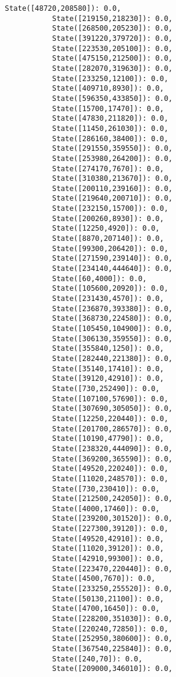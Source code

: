 \documentclass[11pt]{article}
\begin{document}
\begin{Verbatim}[commandchars=\\\{\}]
           State([48720,208580]): 0.0,
           State([219150,218230]): 0.0,
           State([268500,205230]): 0.0,
           State([391220,379720]): 0.0,
           State([223530,205100]): 0.0,
           State([475150,212500]): 0.0,
           State([282070,319630]): 0.0,
           State([233250,12100]): 0.0,
           State([409710,8930]): 0.0,
           State([596350,433850]): 0.0,
           State([15700,17470]): 0.0,
           State([47830,211820]): 0.0,
           State([11450,261030]): 0.0,
           State([286160,38400]): 0.0,
           State([291550,359550]): 0.0,
           State([253980,264200]): 0.0,
           State([274170,7670]): 0.0,
           State([310380,213670]): 0.0,
           State([200110,239160]): 0.0,
           State([219640,200710]): 0.0,
           State([232150,15700]): 0.0,
           State([200260,8930]): 0.0,
           State([12250,4920]): 0.0,
           State([8870,207140]): 0.0,
           State([99300,206420]): 0.0,
           State([271590,239140]): 0.0,
           State([234140,444640]): 0.0,
           State([60,4000]): 0.0,
           State([105600,20920]): 0.0,
           State([231430,4570]): 0.0,
           State([236870,393380]): 0.0,
           State([368730,224580]): 0.0,
           State([105450,104900]): 0.0,
           State([306130,359550]): 0.0,
           State([355840,1250]): 0.0,
           State([282440,221380]): 0.0,
           State([35140,17410]): 0.0,
           State([39120,42910]): 0.0,
           State([730,252490]): 0.0,
           State([107100,57690]): 0.0,
           State([307690,305050]): 0.0,
           State([12250,220440]): 0.0,
           State([201700,286570]): 0.0,
           State([10190,47790]): 0.0,
           State([238320,444090]): 0.0,
           State([369200,365590]): 0.0,
           State([49520,220240]): 0.0,
           State([11020,248570]): 0.0,
           State([730,230410]): 0.0,
           State([212500,242050]): 0.0,
           State([4000,17460]): 0.0,
           State([239200,301520]): 0.0,
           State([227300,39120]): 0.0,
           State([49520,42910]): 0.0,
           State([11020,39120]): 0.0,
           State([42910,99300]): 0.0,
           State([223470,220440]): 0.0,
           State([4500,7670]): 0.0,
           State([233250,255520]): 0.0,
           State([50130,21100]): 0.0,
           State([4700,16450]): 0.0,
           State([228200,351030]): 0.0,
           State([220240,72850]): 0.0,
           State([252950,380600]): 0.0,
           State([367540,225840]): 0.0,
           State([240,70]): 0.0,
           State([209000,346010]): 0.0,

\end{Verbatim}
\end{document}

